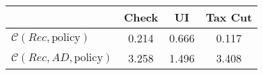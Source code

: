 \begin{tabular}{@{}lccc@{}} 
\toprule 
                          & Check      & UI    & Tax Cut    \\  \midrule 
$\mathcal{C}(Rec,\text{policy})$ & 0.214  & 0.666  & 0.117     \\ 
$\mathcal{C}(Rec, AD,\text{policy})$ & 3.258  & 1.496  & 3.408     \\ 
\end{tabular}  
